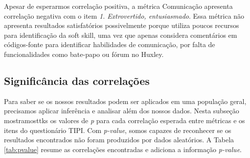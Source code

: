 Apesar de esperarmos correlação positiva, a métrica Comunicação apresenta correlação negativa com o item \textit{1. Extrovertido, entusiasmado}.
Essa métrica não apresenta resultados satisfatórios possivelmente porque utiliza poucos recursos para identificação da soft skill,
uma vez que apenas considera comentários em códigos-fonte para identificar habilidades de comunicação,
por falta de funcionalidades como bate-papo ou fórum no Huxley.

\subsection{Significância das correlações}

Para saber se os nossos resultados podem ser aplicados em uma população geral, precisamos aplicar inferência e analisar além dos nossos dados.
Nesta subseção mostramosttks os valores de \textit{p} para cada correlação esperada entre métricas e os itens do questionário TIPI.
Com \textit{p-value}, somos capazes de reconhecer se os resultados encontrados não foram produzidos por dados aleatórios.
A Tabela \ref{tab:pvalue} resume as correlações encontradas e adiciona a informação \textit{p-value}.

